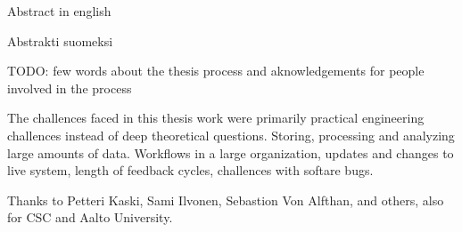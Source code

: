 \makecoverpage
\makecopyrightpage

\begin{abstractpage}[english]
Abstract in english
\end{abstractpage}

\begin{abstractpage}[finnish]
Abstrakti suomeksi
\end{abstractpage}

TODO: few words about the thesis process and aknowledgements for people involved in the process

The challences faced in this thesis work were primarily practical engineering challences instead of deep theoretical questions.
Storing, processing and analyzing large amounts of data.
Workflows in a large organization, updates and changes to live system, length of feedback cycles, challences with softare bugs.

Thanks to Petteri Kaski, Sami Ilvonen, Sebastion Von Alfthan, and others, also for CSC and Aalto University.

\newpage

\setcounter{tocdepth}{2}
\thesistableofcontents
